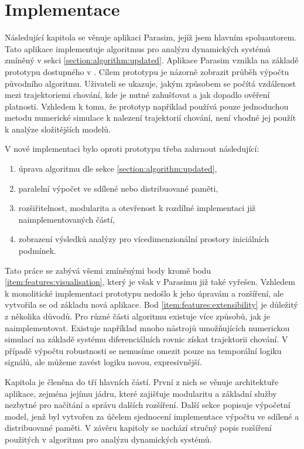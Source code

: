 \chapter{Implementace}\label{chapter:implementation}
Následující kapitola se věnuje aplikaci Parasim, jejíž jsem hlavním spoluautorem.
Tato aplikace implementuje algoritmus pro
analýzu dynamických systémů zmíněný v sekci \ref{section:algorithm:updated}. Aplikace Parasim
vznikla na základě prototypu dostupného v \cite{drazan2011}. Cílem prototypu je názorně
zobrazit průběh výpočtu původního algoritmu. Uživateli se ukazuje, jakým způsobem
se počítá vzdá\-le\-nost mezi trajektoriemi chování, kde je nutné zahušťovat a jak dopadlo
ověření platnosti. Vzhledem k tomu, že prototyp například používá pouze jednoduchou metodu
numerické simulace k nalezení trajektorií chování, není vhodné jej použít k analýze složitějších modelů.

V nové implementaci bylo oproti prototypu třeba zahrnout následující:

\begin{enumerate}
	\item	úprava algoritmu dle sekce \ref{section:algorithm:updated},
	\item	paralelní výpočet ve sdílené nebo distribuované paměti,
	\item	rozšiřitelnost, modularita a otevřenost k rozdílné implementaci již naimplementovaných částí,\label{item:features:extensibility}
	\item	zobrazení výsledků analýzy pro vícedimenzionální prostory ini\-ciál\-ních podmínek.\label{item:features:visualisation}
\end{enumerate}

Tato práce se zabývá všemi zmíněnými body kromě bodu \ref{item:features:visualisation},
který je však v Parasimu již také vyřešen. Vzhledem k monolitické implementaci prototypu
nedošlo k jeho úpravám a rozšíření, ale vytvořila se od základu nová aplikace.
Bod \ref{item:features:extensibility} je důležitý z několika důvodů. Pro různé části algoritmu
existuje více způsobů, jak je naimplementovat. Existuje například mnoho nástrojů umožňujících
numerickou simulací na základě systému diferenciálních rovnic získat trajektorii chování.
V případě výpočtu robustnosti se nemusíme omezit pouze na temporální logiku signálů,
ale můžeme zavést logiku novou, expresivněj\-ší.

Kapitola je členěna do tří hlavních částí. První z nich se věnuje architektuře aplikace,
zejména jejímu jádru, které zajišťuje modularitu a základní služby nezbytné pro načítání
a správu dalších rozšíření. Další sekce popisuje výpočetní model,
jenž byl vytvořen za účelem sjednocení implementace výpočtu ve sdílené a distribuované paměti.
V závěru kapitoly se na\-chá\-zí stručný popis rozšíření použitých v algoritmu pro analýzu
dynamických systémů.


